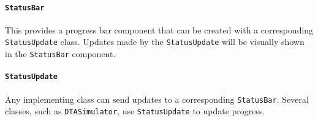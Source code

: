 \paragraph*{\texttt{StatusBar}} This provides a progress bar component that can be created with a corresponding \texttt{StatusUpdate} class. Updates made by the \texttt{StatusUpdate} will be visually shown in the \texttt{StatusBar} component.

\paragraph*{\texttt{StatusUpdate}} Any implementing class can send updates to a corresponding \texttt{StatusBar}. Several classes, such as \texttt{DTASimulator}, use \texttt{StatusUpdate} to update progress.


